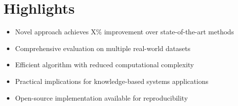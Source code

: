 \documentclass{article}
\begin{document}
\section*{Highlights}

\begin{itemize}
    \item Novel approach achieves X\% improvement over state-of-the-art methods
    \item Comprehensive evaluation on multiple real-world datasets 
    \item Efficient algorithm with reduced computational complexity
    \item Practical implications for knowledge-based systems applications
    \item Open-source implementation available for reproducibility
\end{itemize}
\end{document}
